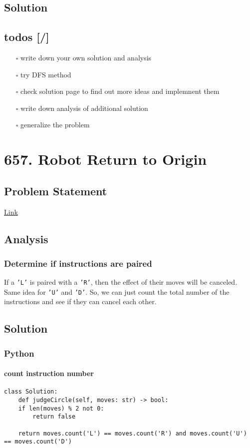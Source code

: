 \documentclass[11pt]{article}
\begin{document}
\subsection{Solution}
\label{sec:org7ac4398}
\subsection{todos [/]}
\label{sec:org7f003ed}
\begin{itemize}
\item[{$\square$}] write down your own solution and analysis
\item[{$\square$}] try DFS method
\item[{$\square$}] check solution page to find out more ideas and implemnent them
\item[{$\square$}] write down analysis of additional solution
\item[{$\square$}] generalize the problem
\end{itemize}
\section{657. Robot Return to Origin}
\label{sec:org83cd84d}
\subsection{Problem Statement}
\label{sec:org21a0cb2}
\href{https://leetcode.com/problems/robot-return-to-origin/}{Link}
\subsection{Analysis}
\label{sec:org5b7736f}
\subsubsection{Determine if instructions are paired}
\label{sec:org2d62215}
If a \texttt{'L'} is paired with a \texttt{'R'}, then the effect of their moves will be canceled. Same idea for \texttt{'U'} and \texttt{'D'}. So, we can just count the total number of the instructions and see if they can cancel each other.
\subsection{Solution}
\label{sec:org6667b35}
\subsubsection{Python}
\label{sec:org14816b0}
\paragraph{count instruction number}
\label{sec:org924c0c2}
\begin{verbatim}
class Solution:
    def judgeCircle(self, moves: str) -> bool:
	if len(moves) % 2 not 0:
	    return false

	return moves.count('L') == moves.count('R') and moves.count('U') == moves.count('D')
\end{verbatim}
\end{document}
